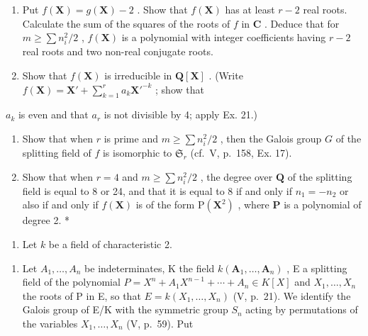 \begin{enumerate}
\def\labelenumi{\alph{enumi})}
\item
  Put \(f(\mathbf{X}) = g(\mathbf{X}) - 2\) . Show that \(f(\mathbf{X})\) has at least \(r - 2\) real roots. Calculate the sum of the squares of the roots of \(f\) in \(\mathbf{C}\) . Deduce that for \(m \geqslant \sum n_i^2 / 2\) , \(f(\mathbf{X})\) is a polynomial with integer coefficients having \(r - 2\) real roots and two non-real conjugate roots.
\item
  Show that \(f(\mathbf{X})\) is irreducible in \(\mathbf{Q}[\mathbf{X}]\) . (Write \(f(\mathbf{X}) = \mathbf{X}' + \sum_{k=1}^{r} a_k \mathbf{X}'^{-k}\) ; show that
\end{enumerate}

\(a_{k}\) is even and that \(a_{r}\) is not divisible by 4; apply Ex. 21.)

\begin{enumerate}
\def\labelenumi{\alph{enumi})}
\setcounter{enumi}{2}
\item
  Show that when \(r\) is prime and \(m \geqslant \sum n_i^2 / 2\) , then the Galois group \(G\) of the splitting field of \(f\) is isomorphic to \(\mathfrak{S}_r\) (cf.~V, p.~158, Ex. 17).
\item
  Show that when \(r = 4\) and \(m \geqslant \sum n_i^2 / 2\) , the degree over \(\mathbf{Q}\) of the splitting field is equal to 8 or 24, and that it is equal to 8 if and only if \(n_1 = -n_2\) or also if and only if \(f(\mathbf{X})\) is of the form \(\mathrm{P}(\mathbf{X}^2)\) , where \(\mathbf{P}\) is a polynomial of degree 2. *
\end{enumerate}

\begin{enumerate}
\def\labelenumi{\arabic{enumi})}
\setcounter{enumi}{22}
\tightlist
\item
  Let \(k\) be a field of characteristic 2.
\end{enumerate}

\begin{enumerate}
\def\labelenumi{\alph{enumi})}
\tightlist
\item
  Let \(A_{1}, \ldots, A_{n}\) be indeterminates, K the field \(k(\mathbf{A}_{1}, \ldots, \mathbf{A}_{n})\) , E a splitting field of the polynomial \(P = X^{n} + A_{1}X^{n-1} + \cdots + A_{n} \in K[X]\) and \(X_{1}, \ldots, X_{n}\) the roots of P in E, so that \(E = k(X_{1}, \ldots, X_{n})\) (V, p.~21). We identify the Galois group of E/K with the symmetric group \(S_{n}\) acting by permutations of the variables \(X_{1}, \ldots, X_{n}\) (V, p.~59). Put
\end{enumerate}

